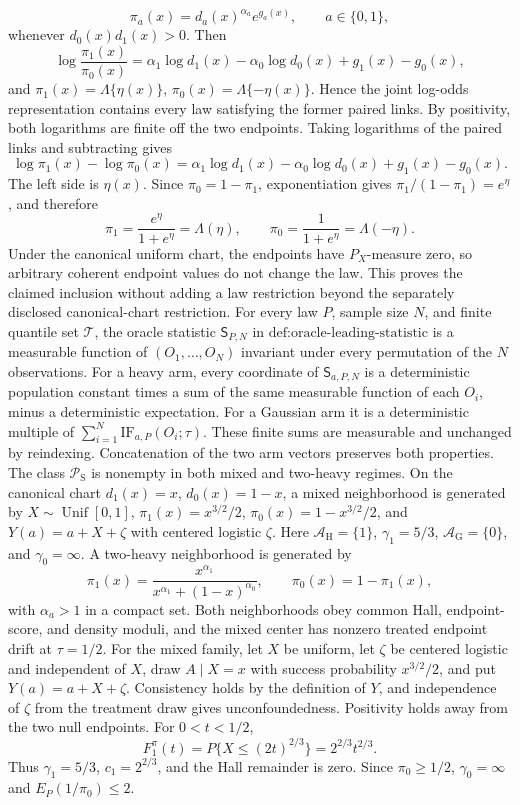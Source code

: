 \[
 \pi_a(x)=d_a(x)^{\alpha_a}e^{g_a(x)},\qquad a\in\{0,1\},
\]
whenever \(d_0(x)d_1(x)>0\).  Then
\[
 \log\frac{\pi_1(x)}{\pi_0(x)}
 =\alpha_1\log d_1(x)-\alpha_0\log d_0(x)+g_1(x)-g_0(x),
\]
and \(\pi_1(x)=\Lambda\{\eta(x)\}\), \(\pi_0(x)=\Lambda\{-\eta(x)\}\).  Hence the joint log-odds representation contains every law satisfying the former paired links.
By positivity, both logarithms are finite off the two endpoints.  Taking logarithms of the paired links and subtracting gives
\[
 \log\pi_1(x)-\log\pi_0(x)
 =\alpha_1\log d_1(x)-\alpha_0\log d_0(x)+g_1(x)-g_0(x).
\]
The left side is \(\eta(x)\).  Since \(\pi_0=1-\pi_1\), exponentiation gives \(\pi_1/(1-\pi_1)=e^\eta\), and therefore
\[
 \pi_1=\frac{e^\eta}{1+e^\eta}=\Lambda(\eta),
 \qquad
 \pi_0=\frac1{1+e^\eta}=\Lambda(-\eta).
\]
Under the canonical uniform chart, the endpoints have \(P_X\)-measure zero, so arbitrary coherent endpoint values do not change the law.  This proves the claimed inclusion without adding a law restriction beyond the separately disclosed canonical-chart restriction.
For every law \(P\), sample size \(N\), and finite quantile set \(\mathcal T\), the oracle statistic \(\mathsf S_{P,N}\) in \(\text{def:oracle-leading-statistic}\) is a measurable function of \((O_1,\ldots,O_N)\) invariant under every permutation of the \(N\) observations.
For a heavy arm, every coordinate of \(\mathsf S_{a,P,N}\) is a deterministic population constant times a sum of the same measurable function of each \(O_i\), minus a deterministic expectation.  For a Gaussian arm it is a deterministic multiple of \(\sum_{i=1}^N\mathrm{IF}_{a,P}(O_i;\tau)\).  These finite sums are measurable and unchanged by reindexing.  Concatenation of the two arm vectors preserves both properties.
The class \(\mathcal P_{\mathrm S}\) is nonempty in both mixed and two-heavy regimes.  On the canonical chart \(d_1(x)=x\), \(d_0(x)=1-x\), a mixed neighborhood is generated by \(X\sim\operatorname{Unif}[0,1]\), \(\pi_1(x)=x^{3/2}/2\), \(\pi_0(x)=1-x^{3/2}/2\), and \(Y(a)=a+X+\zeta\) with centered logistic \(\zeta\).  Here \(\mathcal A_{\mathrm H}=\{1\}\), \(\gamma_1=5/3\), \(\mathcal A_{\mathrm G}=\{0\}\), and \(\gamma_0=\infty\).  A two-heavy neighborhood is generated by
\[
 \pi_1(x)=\frac{x^{\alpha_1}}{x^{\alpha_1}+(1-x)^{\alpha_0}},
 \qquad \pi_0(x)=1-\pi_1(x),
\]
with \(\alpha_a>1\) in a compact set.  Both neighborhoods obey common Hall, endpoint-score, and density moduli, and the mixed center has nonzero treated endpoint drift at \(\tau=1/2\).
For the mixed family, let \(X\) be uniform, let \(\zeta\) be centered logistic and independent of \(X\), draw \(A\mid X=x\) with success probability \(x^{3/2}/2\), and put \(Y(a)=a+X+\zeta\).  Consistency holds by the definition of \(Y\), and independence of \(\zeta\) from the treatment draw gives unconfoundedness.  Positivity holds away from the two null endpoints.  For \(0<t<1/2\),
\[
 F_1^\pi(t)=P\{X\le(2t)^{2/3}\}=2^{2/3}t^{2/3}.
\]
Thus \(\gamma_1=5/3\), \(c_1=2^{2/3}\), and the Hall remainder is zero.  Since \(\pi_0\ge1/2\), \(\gamma_0=\infty\) and \(E_P(1/\pi_0)\le2\).

